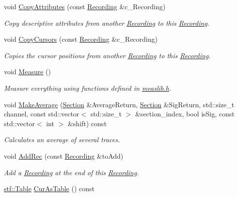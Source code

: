 \begin{DoxyCompactItemize}
void \hyperlink{classRecording_ad44e106c4ffe8d4af16b42f1441f111c}{CopyAttributes} (const \hyperlink{classRecording}{Recording} \&c\_\-Recording)
\begin{DoxyCompactList}\small\item\em Copy descriptive attributes from another \hyperlink{classRecording}{Recording} to this \hyperlink{classRecording}{Recording}. \item\end{DoxyCompactList}\item 
void \hyperlink{classRecording_a7518665dfaa12dc460c6df2a28e241a4}{CopyCursors} (const \hyperlink{classRecording}{Recording} \&c\_\-Recording)
\begin{DoxyCompactList}\small\item\em Copies the cursor positions from another \hyperlink{classRecording}{Recording} to this \hyperlink{classRecording}{Recording}. \item\end{DoxyCompactList}\item 
void \hyperlink{classRecording_a6013d836fff642a89db9ec0d1cd2d4f5}{Measure} ()
\begin{DoxyCompactList}\small\item\em Measure everything using functions defined in \hyperlink{measlib_8h}{measlib.h}. \item\end{DoxyCompactList}\item 
void \hyperlink{classRecording_a0c3f8c9a5cbdc0cfc37b6d64892d4113}{MakeAverage} (\hyperlink{classSection}{Section} \&AverageReturn, \hyperlink{classSection}{Section} \&SigReturn, std::size\_\-t channel, const std::vector$<$ std::size\_\-t $>$ \&section\_\-index, bool isSig, const std::vector$<$ int $>$ \&shift) const 
\begin{DoxyCompactList}\small\item\em Calculates an average of several traces. \item\end{DoxyCompactList}\item 
void \hyperlink{classRecording_a8a56a6d44309b20e553a346ecbeb2082}{AddRec} (const \hyperlink{classRecording}{Recording} \&toAdd)
\begin{DoxyCompactList}\small\item\em Add a \hyperlink{classRecording}{Recording} at the end of this \hyperlink{classRecording}{Recording}. \item\end{DoxyCompactList}\item 
\hypertarget{classRecording_a28c67ae36596ef4435576ab8e855aedc}{
\hyperlink{classstf_1_1Table}{stf::Table} \hyperlink{classRecording_a28c67ae36596ef4435576ab8e855aedc}{CurAsTable} () const }
\label{classRecording_a28c67ae36596ef4435576ab8e855aedc}


\end{DoxyCompactItemize}
